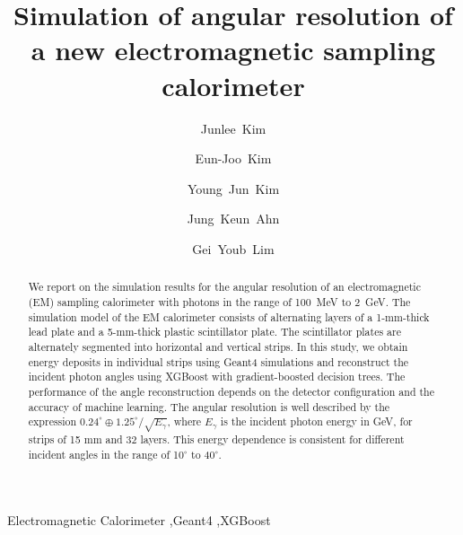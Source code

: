\documentclass[12pt,times,draftclsnofoot,a4paper]{elsarticle}
\begin{document}
\begin{frontmatter}

\setcounter{page}{0}
\title{Simulation of angular resolution of a new electromagnetic sampling calorimeter}

\author[jbnu]{Junlee~Kim}

\author[jbnu]{Eun-Joo~Kim}

\author[korea]{Young~Jun~Kim}
\author[korea]{Jung~Keun~Ahn}
\author[kek]{Gei~Youb~Lim}

\address[jbnu]{Division of Science Education, Jeonbuk National University, Jeonju 54896, Korea}
\address[korea]{Department of Physics, Korea University, Seoul 02841, Korea}
\address[kek]{Institute of Particle and Nuclear Studies (IPNS), High Energy Accelerator Research Organization (KEK), Tsukuba 305-0801, Japan}


\begin{abstract}
We report on the simulation results for the angular resolution of an electromagnetic (EM) sampling calorimeter with photons in the range of 100~MeV to 2~GeV. The simulation model of the EM calorimeter consists of alternating layers of a 1-mm-thick lead plate and a 5-mm-thick plastic scintillator plate. The scintillator plates are alternately segmented into horizontal and vertical strips. In this study, we obtain energy deposits in individual strips using Geant4 simulations and reconstruct the incident photon angles using XGBoost with gradient-boosted decision trees. The performance of the angle reconstruction depends on the detector configuration and the accuracy of machine learning. The angular resolution is well described by the expression $0.24^{\circ} \oplus 1.25^{\circ}/\sqrt{E_{\gamma}}$, where $E_{\gamma}$ is the incident photon energy in GeV, for strips of 15 mm and 32 layers. This energy dependence is consistent for different incident angles in the range of 10$^{\circ}$ to 40$^{\circ}$.

\end{abstract}
\begin{keyword}
Electromagnetic Calorimeter \sep Geant4 \sep XGBoost
\end{keyword}

\end{frontmatter}
\end{document}
